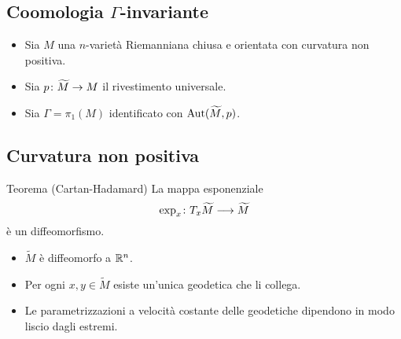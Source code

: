 \documentclass{beamer}
\begin{document}
\subsection{Coomologia $\Gamma$-invariante}
\begin{frame}{\secname}{\subsecname}
\begin{itemize}[<+->]
\item Sia $M$ una $n$-varietà Riemanniana chiusa e orientata con curvatura non positiva.
\item Sia $\map{p}{\widetilde M}{M}$ il rivestimento universale.
\item Sia $\Gamma=\pi_1(M)$ identificato con $\operatorname{Aut}(\widetilde M,p)$.
\end{itemize}

\end{frame}
\subsection{Curvatura non positiva}
\begin{frame}{\secname}{\subsecname}
\begin{block}{Teorema (Cartan-Hadamard)}
La mappa esponenziale
\[
\map{\exp_x}{T_x\widetilde M}{\widetilde M}
\]
è un diffeomorfismo.
\end{block}
\pause
\begin{itemize}[<+->]
\item $\widetilde M$ è diffeomorfo a $\mathbb{R}^n$.
\item Per ogni $x,y\in\widetilde M$ esiste un'unica geodetica che li collega.
\item Le parametrizzazioni a velocità costante delle geodetiche dipendono in modo liscio dagli estremi.
\end{itemize}
\end{frame}
\end{document}
